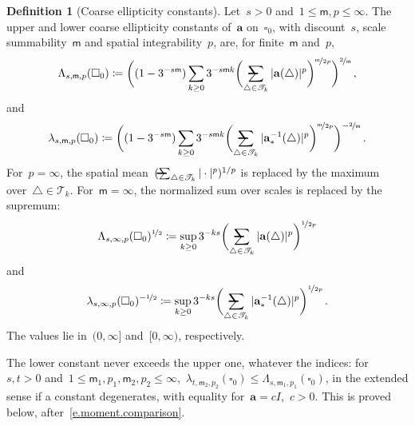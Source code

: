 \documentclass[11pt,letterpaper]{article}
\makeatletter
\numberwithin{equation}{section}
\theoremstyle{definition}
\newtheorem{definition}[theorem]{Definition}
\renewcommand{\a}{\mathbf{a}}
\newcommand{\nf}{\nicefrac}
\newcommand{\cu}{\square}
\newcommand{\avsum}{\mathop{\mathpalette\avsuminner\relax}\displaylimits}
\newcommand\avsuminner[2]{%
	{\sbox0{$\m@th#1\sum$}%
		\vphantom{\usebox0}%
		\ooalign{%
			\hidewidth
			\smash{\,\rule[.23em]{8.8pt}{1.1pt} \relax}%
			\hidewidth\cr
			$\m@th#1\sum$\cr
		}%
	}%
}
\makeatother
\begin{document}
\begin{definition}[Coarse ellipticity constants]
\label{d.cg.constants}
Let~$s>0$ and~$1\leq\mathsf m,p\leq\infty$. The upper and lower coarse ellipticity constants of~$\a$ on~$\cu_0$, with discount~$s$, scale summability~$\mathsf m$ and spatial integrability~$p$, are, for finite~$\mathsf m$ and~$p$,
\begin{equation}
	\Lambda_{s,\mathsf m,p}(\cu_0)\coloneqq\biggl((1-3^{-s\mathsf m})\sum_{k\geq0}3^{-s\mathsf mk}\biggl(\avsum_{\triangle\in\mathscr T_k}|\a(\triangle)|^p\biggr)^{\nf{\mathsf m}{2p}}\biggr)^{\nf2{\mathsf m}}\,,
	\label{e.upper.spatial.moment}
\end{equation}
and
\begin{equation}
	\lambda_{s,\mathsf m,p}(\cu_0)\coloneqq\biggl((1-3^{-s\mathsf m})\sum_{k\geq0}3^{-s\mathsf mk}\biggl(\avsum_{\triangle\in\mathscr T_k}|\a_*^{-1}(\triangle)|^p\biggr)^{\nf{\mathsf m}{2p}}\biggr)^{-\nf2{\mathsf m}}\,.
	\label{e.lower.spatial.moment}
\end{equation}
For~$p=\infty$, the spatial mean~$(\avsum_{\triangle\in\mathscr T_k}|\cdot|^p)^{1/p}$ is replaced by the maximum over~$\triangle\in\mathscr T_k$. For~$\mathsf m=\infty$, the normalized sum over scales is replaced by the supremum:
\begin{equation*}
	\Lambda_{s,\infty,p}(\cu_0)^{\nf12}\coloneqq\sup_{k\geq0}3^{-ks}\biggl(\avsum_{\triangle\in\mathscr T_k}|\a(\triangle)|^p\biggr)^{\nf1{2p}}
\end{equation*}
and
\begin{equation*}
	\lambda_{s,\infty,p}(\cu_0)^{-\nf12}\coloneqq\sup_{k\geq0}3^{-ks}\biggl(\avsum_{\triangle\in\mathscr T_k}|\a_*^{-1}(\triangle)|^p\biggr)^{\nf1{2p}}\,.
\end{equation*}
The values lie in~$(0,\infty]$ and~$[0,\infty)$, respectively.
\end{definition}

The lower constant never exceeds the upper one, whatever the indices: for~$s,t>0$ and~$1\leq\mathsf m_1,p_1,\mathsf m_2,p_2\leq\infty$,~$\lambda_{t,\mathsf m_2,p_2}(\cu_0)\leq\Lambda_{s,\mathsf m_1,p_1}(\cu_0)$, in the extended sense if a constant degenerates, with equality for~$\a=cI$,~$c>0$. This is proved below, after~\eqref{e.moment.comparison}.

\smallskip
\end{document}

